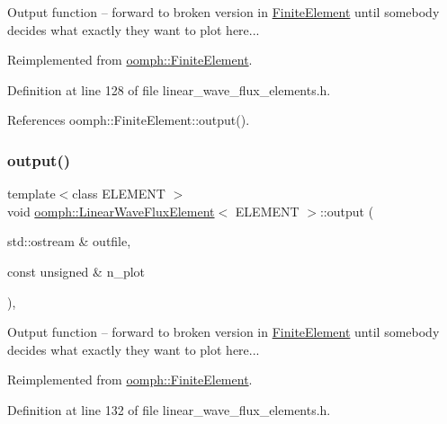 Output function -- forward to broken version in \hyperlink{classoomph_1_1FiniteElement}{Finite\+Element} until somebody decides what exactly they want to plot here... 

Reimplemented from \hyperlink{classoomph_1_1FiniteElement_a2ad98a3d2ef4999f1bef62c0ff13f2a7}{oomph\+::\+Finite\+Element}.



Definition at line 128 of file linear\+\_\+wave\+\_\+flux\+\_\+elements.\+h.



References oomph\+::\+Finite\+Element\+::output().

\mbox{\label{classoomph_1_1LinearWaveFluxElement_ae767010f3b965889d917a4c41f8db956}} 
\subsubsection{\texorpdfstring{output()}{output()}\hspace{0.1cm}{\footnotesize\ttfamily [2/4]}}
{\footnotesize\ttfamily template$<$class E\+L\+E\+M\+E\+NT $>$ \\
void \hyperlink{classoomph_1_1LinearWaveFluxElement}{oomph\+::\+Linear\+Wave\+Flux\+Element}$<$ E\+L\+E\+M\+E\+NT $>$\+::output (\begin{DoxyParamCaption}\item[{std\+::ostream \&}]{outfile,  }\item[{const unsigned \&}]{n\+\_\+plot }\end{DoxyParamCaption})\hspace{0.3cm}{\ttfamily [inline]}, {\ttfamily [virtual]}}



Output function -- forward to broken version in \hyperlink{classoomph_1_1FiniteElement}{Finite\+Element} until somebody decides what exactly they want to plot here... 



Reimplemented from \hyperlink{classoomph_1_1FiniteElement_afa9d9b2670f999b43e6679c9dd28c457}{oomph\+::\+Finite\+Element}.



Definition at line 132 of file linear\+\_\+wave\+\_\+flux\+\_\+elements.\+h.



